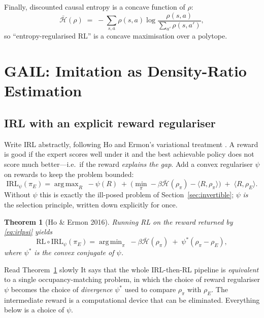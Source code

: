 \documentclass[11pt]{article}
\theoremstyle{plain}
\newtheorem{theorem}{Theorem}[section]
\theoremstyle{definition}
\theoremstyle{remark}
\DeclareMathOperator*{\argmax}{arg\,max}
\DeclareMathOperator*{\argmin}{arg\,min}
\begin{document}
Finally, discounted causal entropy is a concave function of $\rho$:
\begin{equation}
\bar{\mathcal{H}}(\rho) \;=\; -\sum_{s,a} \rho(s,a) \log\frac{\rho(s,a)}{\sum_{a'}\rho(s,a')},
\label{eq:occentropy}
\end{equation}
so ``entropy-regularised RL'' is a concave maximisation over a polytope.

\section{GAIL: Imitation as Density-Ratio Estimation}

\subsection{IRL with an explicit reward regulariser}

Write IRL abstractly, following Ho and Ermon's variational treatment
\cite{hoermon2016}. A reward is good if the expert scores well under it
and the best achievable policy does not score much better---i.e.\ if the
reward \emph{explains the gap}. Add a convex regulariser $\psi$ on rewards
to keep the problem bounded:
\begin{equation}
\mathrm{IRL}_\psi(\pi_E) = \argmax_R \; -\psi(R) \;+\; \Big(\min_\pi
-\beta\bar{\mathcal{H}}(\rho_\pi) - \langle R,\rho_\pi\rangle\Big) \;+\;
\langle R,\rho_E\rangle.
\label{eq:irlpsi}
\end{equation}
Without $\psi$ this is exactly the ill-posed problem of
Section~\ref{sec:invertible}; $\psi$ \emph{is} the selection principle,
written down explicitly for once.

\begin{theorem}[Ho \& Ermon 2016]\label{thm:hoermon}
Running RL on the reward returned by \eqref{eq:irlpsi} yields
\begin{equation}
\mathrm{RL}\circ\mathrm{IRL}_\psi(\pi_E) = \argmin_\pi \; -\beta\bar{\mathcal{H}}(\rho_\pi) \;+\;
\psi^*(\rho_\pi - \rho_E),
\label{eq:rlirl}
\end{equation}
where $\psi^*$ is the convex conjugate of $\psi$.
\end{theorem}

\begin{graybox}{Read Theorem~\ref{thm:hoermon} slowly}
It says that the whole IRL-then-RL pipeline is \emph{equivalent} to a
single occupancy-matching problem, in which the choice of reward
regulariser $\psi$ becomes the choice of \emph{divergence} $\psi^*$ used
to compare $\rho_\pi$ with $\rho_E$. The intermediate reward is a
computational device that can be eliminated. Everything below is a choice
of $\psi$.
\end{graybox}
\end{document}
